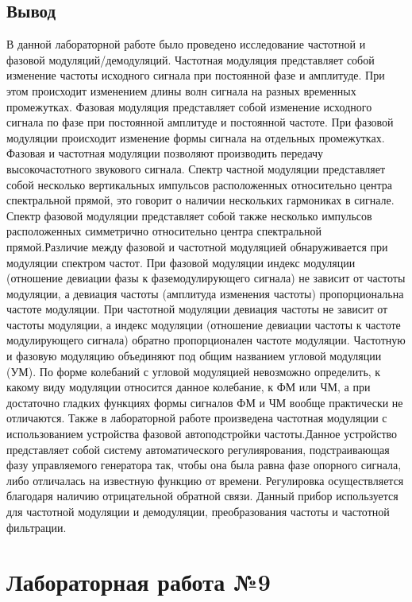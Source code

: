 \documentclass[10pt,a4paper]{report}
\begin{document}
\section{Вывод}
В данной лабораторной работе было проведено исследование частотной и фазовой модуляций/демодуляций. Частотная модуляция представляет собой изменение частоты исходного сигнала
при постоянной фазе и амплитуде. При этом происходит изменением длины волн сигнала на разных временных промежутках. Фазовая модуляция представляет собой изменение исходного
сигнала по фазе при постоянной амплитуде и постоянной частоте. При фазовой модуляции происходит изменение формы сигнала на отдельных промежутках. Фазовая и частотная модуляции
позволяют производить передачу высокочастотного звукового сигнала. Спектр частной модуляции представляет собой несколько вертикальных импульсов расположенных относительно центра 
спектральной прямой, это говорит о наличии нескольких гармониках в сигнале. Спектр фазовой модуляции представляет собой также несколько импульсов расположенных симметрично 
относительно центра спектральной прямой.Различие между фазовой и частотной модуляцией обнаруживается при модуляции спектром частот. При фазовой модуляции индекс модуляции 
(отношение девиации фазы к фаземодулирующего сигнала) не зависит от частоты модуляции, а девиация частоты (амплитуда изменения частоты) пропорциональна частоте модуляции. При частотной модуляции 
девиация частоты не зависит от частоты модуляции, а индекс модуляции (отношение девиации частоты к частоте модулирующего сигнала) обратно пропорционален частоте модуляции.
Частотную и фазовую модуляцию объединяют под общим названием угловой модуляции (УМ). По форме колебаний с угловой модуляцией невозможно определить, к какому виду модуляции 
относится данное колебание, к ФМ или ЧМ, а при достаточно гладких функциях формы сигналов ФМ и ЧМ вообще практически не отличаются. 
Также в лабораторной работе произведена частотная модуляции с использованием устройства фазовой автоподстройки частоты.Данное устройство представляет собой систему 
автоматического регулиярования, подстраивающая фазу управляемого генератора так, чтобы она была равна фазе опорного сигнала, либо отличалась на известную функцию от времени. 
Регулировка осуществляется благодаря наличию отрицательной обратной связи. Данный прибор используется для частотной модуляции и демодуляции, преобразования частоты и 
частотной фильтрации. 

\chapter{Лабораторная работа №9}
\end{document}
